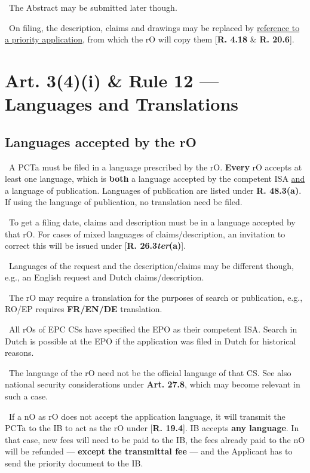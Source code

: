 \documentclass{report}
\newcommand{\n}{\newline}
\newcommand{\p}{\adforn{61} \ }
\begin{document}
\p The Abstract may be submitted later though. \n

\p On filing, the description, claims and drawings may be replaced by \underline{reference to a priority application,} from which the rO will copy them [\textbf{R. 4.18} \& \textbf{R. 20.6}].

\section{Art. 3(4)(i) \& Rule 12 --- Languages and Translations}

\subsection{Languages accepted by the rO}

\p A PCTa must be filed in a language prescribed by the rO. \textbf{Every} rO accepts at least one language, which is \textbf{both} a language accepted by the competent ISA \underline{and} a language of publication. Languages of publication are listed under \textbf{R. 48.3(a)}. If using the language of publication, no translation need be filed.  \n

\p To get a filing date, claims and description must be in a language accepted by that rO. For cases of mixed languages of claims/description, an invitation to correct this will be issued under [\textbf{R. 26.3\textit{ter}(a)}]. \n

\p Languages of the request and the description/claims may be different though, e.g., an English request and Dutch claims/description. \n

\p The rO may require a translation for the purposes of search or publication, e.g., \textsc{RO/EP} requires \textbf{FR/EN/DE} translation. \n

\p All rOs of EPC CSs have specified the EPO as their competent ISA. Search in Dutch is possible at the EPO if the application was filed in Dutch for historical reasons. \n

\p The language of the rO need not be the official language of that CS. See also national security considerations under \textbf{Art. 27.8}, which may become relevant in such a case. \n

\p If a nO as rO does not accept the application language, it will transmit the PCTa to the IB to act as the rO under [\textbf{R. 19.4}]. IB accepts \textbf{any language}. In that case, new fees will need to be paid to the IB, the fees already paid to the nO will be refunded --- \textbf{except the transmittal fee} --- and the Applicant has to send the priority document to the IB. \n
\end{document}

